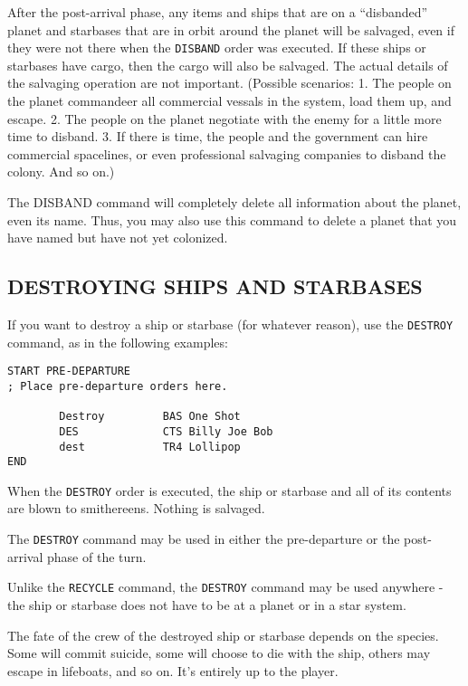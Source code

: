 \documentclass[10pt,titlepage]{article}
\begin{document}
After the post-arrival phase, any items and ships that are on a ``disbanded''
planet and starbases that are in orbit around the planet will be salvaged,
even if they were not there when the \texttt{DISBAND} order was executed.  If these
ships or starbases have cargo, then the cargo will also be salvaged.  The
actual details of the salvaging operation are not important.  (Possible
scenarios: 1. The people on the planet commandeer all commercial vessals in the
system, load them up, and escape.  2. The people on the planet negotiate with
the enemy for a little more time to disband.  3. If there is time, the people
and the government can hire commercial spacelines, or even professional
salvaging companies to disband the colony.  And so on.)

The DISBAND command will completely delete all information about the planet,
even its name.  Thus, you may also use this command to delete a planet that
you have named but have not yet colonized.


\subsection{DESTROYING SHIPS AND STARBASES}
\label{sec:destroyingships}


If you want to destroy a ship or starbase (for whatever reason), use the
\texttt{DESTROY} command, as in the following examples:

\begin{verbatim}
START PRE-DEPARTURE
; Place pre-departure orders here.

        Destroy         BAS One Shot
        DES             CTS Billy Joe Bob
        dest            TR4 Lollipop
END\end{verbatim} 


When the \texttt{DESTROY} order is executed, the ship or starbase and all of its
contents are blown to smithereens.  Nothing is salvaged.

The \texttt{DESTROY} command may be used in either the pre-departure or the post-arrival
phase of the turn.

Unlike the \texttt{RECYCLE} command, the \texttt{DESTROY} command may be used anywhere - the ship
or starbase does not have to be at a planet or in a star system.

The fate of the crew of the destroyed ship or starbase depends on the species.
Some will commit suicide, some will choose to die with the ship, others may
escape in lifeboats, and so on.  It's entirely up to the player.
\end{document}

